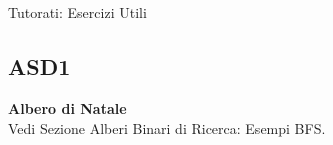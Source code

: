 \documentclass[../cheatSheetAlgoritmi.tex]{subfiles}
\begin{document}
\chapter{}{Tutorati: Esercizi Utili}
\section{ASD1}
\textbf{Albero di Natale}\\
Vedi Sezione Alberi Binari di Ricerca: Esempi BFS.
\end{document}
